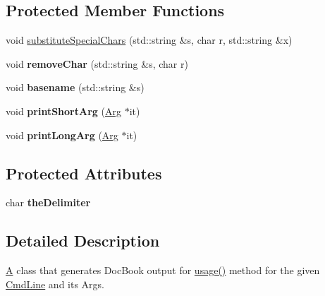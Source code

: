 \subsection*{Protected Member Functions}
\begin{DoxyCompactItemize}
\item 
void \hyperlink{class_t_c_l_a_p_1_1_doc_book_output_a7546eaf3a0effeea1030afb27b4c698f}{substitute\+Special\+Chars} (std\+::string \&s, char r, std\+::string \&x)
\item 
\hypertarget{class_t_c_l_a_p_1_1_doc_book_output_abc059536cb97c49da4e6c5b4a22c6cef}{void {\bfseries remove\+Char} (std\+::string \&s, char r)}\label{class_t_c_l_a_p_1_1_doc_book_output_abc059536cb97c49da4e6c5b4a22c6cef}

\item 
\hypertarget{class_t_c_l_a_p_1_1_doc_book_output_a82d49ab25845c7d191863be9c482409e}{void {\bfseries basename} (std\+::string \&s)}\label{class_t_c_l_a_p_1_1_doc_book_output_a82d49ab25845c7d191863be9c482409e}

\item 
\hypertarget{class_t_c_l_a_p_1_1_doc_book_output_a980ecacfcda0186a76bb6c37a9c33726}{void {\bfseries print\+Short\+Arg} (\hyperlink{class_t_c_l_a_p_1_1_arg}{Arg} $\ast$it)}\label{class_t_c_l_a_p_1_1_doc_book_output_a980ecacfcda0186a76bb6c37a9c33726}

\item 
\hypertarget{class_t_c_l_a_p_1_1_doc_book_output_a891cf5ef71592b5261691575c2adad1d}{void {\bfseries print\+Long\+Arg} (\hyperlink{class_t_c_l_a_p_1_1_arg}{Arg} $\ast$it)}\label{class_t_c_l_a_p_1_1_doc_book_output_a891cf5ef71592b5261691575c2adad1d}

\end{DoxyCompactItemize}
\subsection*{Protected Attributes}
\begin{DoxyCompactItemize}
\item 
\hypertarget{class_t_c_l_a_p_1_1_doc_book_output_a081a02a93ce13f694d078c79fe42a7c8}{char {\bfseries the\+Delimiter}}\label{class_t_c_l_a_p_1_1_doc_book_output_a081a02a93ce13f694d078c79fe42a7c8}

\end{DoxyCompactItemize}


\subsection{Detailed Description}
\hyperlink{class_a}{A} class that generates Doc\+Book output for \hyperlink{class_t_c_l_a_p_1_1_doc_book_output_adc1ec93f3f7e5e912690be01c5e7d6e2}{usage()} method for the given \hyperlink{class_t_c_l_a_p_1_1_cmd_line}{Cmd\+Line} and its Args. 

